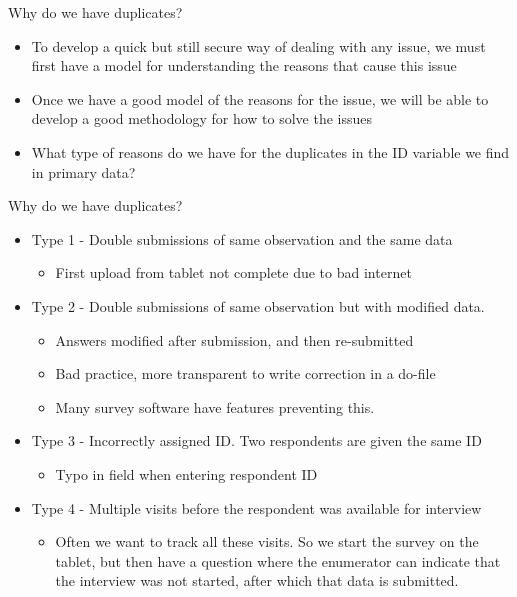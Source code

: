 \documentclass[aspectratio=169]{beamer}
\begin{document}
\begin{frame}{Why do we have duplicates?}
	\begin{itemize}
		\item To develop a quick but still secure way of dealing with any issue, we must first have a model for understanding the reasons that cause this issue
		\item Once we have a good model of the reasons for the issue, we will be able to develop a good methodology for how to solve the issues
		\item What type of reasons do we have for the duplicates in the ID variable we find in primary data?
	\end{itemize}
\end{frame}

\begin{frame}{Why do we have duplicates?}
	\begin{itemize}
		\item Type 1 - Double submissions of same observation and the same data
		\begin{itemize}
			\item First upload from tablet not complete due to bad internet
		\end{itemize}
		\item Type 2 - Double submissions of same observation but with modified data.
		\begin{itemize}
			\item Answers modified after submission, and then re-submitted
			\item Bad practice, more transparent to write correction in a do-file
			\item Many survey software have features preventing this.
		\end{itemize}
		\item Type 3 - Incorrectly assigned ID. Two respondents are given the same ID
		\begin{itemize}
			\item Typo in field when entering respondent ID
		\end{itemize}
		\item Type 4 - Multiple visits before the respondent was available for interview
		\begin{itemize}
			\item Often we want to track all these visits. So we start the survey on the tablet, but then have a question where the enumerator can indicate that the interview was not started, after which that data is submitted.
		\end{itemize}	
	\end{itemize}
\end{frame}
\end{document}
